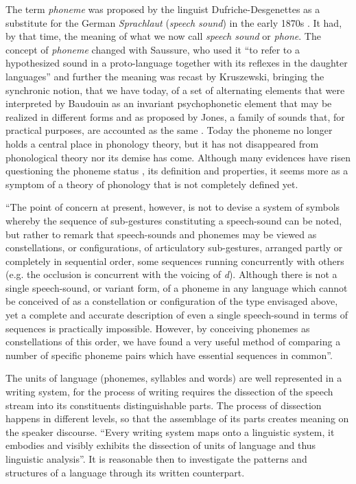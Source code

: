 The term \textit{phoneme} was proposed by the linguist Dufriche-Desgenettes
as a substitute for the German \textit{Sprachlaut} (\textit{speech sound}) in the early 1870s \citep{dresher2011}.
It had, by that time, the meaning of what we now call \textit{speech sound} or \textit{phone}.
The concept of \textit{phoneme} changed with Saussure, who used it ``to refer to a hypothesized sound in a 
proto-language together with its reflexes in the daughter languages'' and further the meaning was 
recast by Kruszewski, bringing the synchronic notion, that we have today, of a set of alternating elements 
that were interpreted by Baudouin as an invariant psychophonetic element that may be realized in different forms
and as proposed by Jones, a family of sounds that, for practical purposes, are
accounted as the same \citep{dresher2011}. Today the phoneme no longer holds a central place
in phonology theory, but it has not disappeared from phonological theory nor its demise has come.
Although many evidences have risen questioning the phoneme status \citep{port2007,port2005,port2006}, 
its definition and properties, it seems more as a symptom of a theory of phonology that is not 
completely defined yet.


``The point of concern at present, however, is not to
devise a system of symbols whereby the sequence of sub-gestures constituting a speech-sound 
can be noted, but rather to remark that speech-sounds and phonemes may be
viewed as constellations, or configurations, of articulatory sub-gestures, arranged partly
or completely in sequential order, some sequences running concurrently with others (e.g.
the occlusion is concurrent with the voicing of \textit{d}). Although there is not a single speech-sound, 
or variant form, of a phoneme in any language which cannot be conceived of as a
constellation or configuration of the type envisaged above, yet a complete and accurate
description of even a single speech-sound in terms of sequences is practically impossible.
However, by conceiving phonemes as constellations of this order, we have found a very
useful method of comparing a number of specific phoneme pairs which have essential
sequences in common''\citep{zipf1949}.


The units of language (phonemes, syllables and words) are well represented in a writing system,
for the process of writing requires the dissection of the
speech stream into its constituents distinguishable parts. The process of dissection happens in
different levels, so that the assemblage of its parts creates meaning on the speaker discourse.
``Every writing system maps onto a linguistic system, it embodies and visibly exhibits the 
dissection of units of language and thus linguistic analysis''\citep{coulmas}.
It is reasonable then to investigate the patterns and structures of a language through its
written counterpart.


